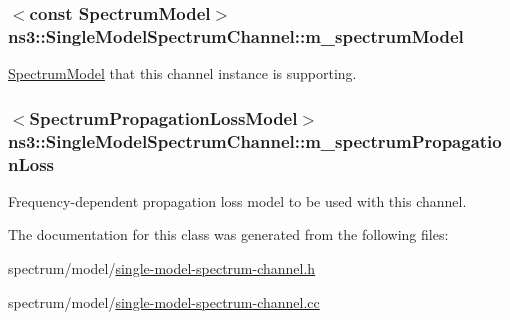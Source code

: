 \subsubsection[{\texorpdfstring{m\+\_\+spectrum\+Model}{m_spectrumModel}}]{$<$const {\bf Spectrum\+Model}$>$ ns3\+::\+Single\+Model\+Spectrum\+Channel\+::m\+\_\+spectrum\+Model\hspace{0.3cm}{\ttfamily [private]}}\hypertarget{classns3_1_1SingleModelSpectrumChannel_a091b6ed95481cac790c42f20a8f4c429}{}\label{classns3_1_1SingleModelSpectrumChannel_a091b6ed95481cac790c42f20a8f4c429}
\hyperlink{classns3_1_1SpectrumModel}{Spectrum\+Model} that this channel instance is supporting. 
\subsubsection[{\texorpdfstring{m\+\_\+spectrum\+Propagation\+Loss}{m_spectrumPropagationLoss}}]{$<${\bf Spectrum\+Propagation\+Loss\+Model}$>$ ns3\+::\+Single\+Model\+Spectrum\+Channel\+::m\+\_\+spectrum\+Propagation\+Loss\hspace{0.3cm}{\ttfamily [private]}}\hypertarget{classns3_1_1SingleModelSpectrumChannel_adc3d2a753657da18986c30751e3f79f4}{}\label{classns3_1_1SingleModelSpectrumChannel_adc3d2a753657da18986c30751e3f79f4}
Frequency-\/dependent propagation loss model to be used with this channel. 

The documentation for this class was generated from the following files\+:\begin{DoxyCompactItemize}
\item 
spectrum/model/\hyperlink{single-model-spectrum-channel_8h}{single-\/model-\/spectrum-\/channel.\+h}\item 
spectrum/model/\hyperlink{single-model-spectrum-channel_8cc}{single-\/model-\/spectrum-\/channel.\+cc}\end{DoxyCompactItemize}

